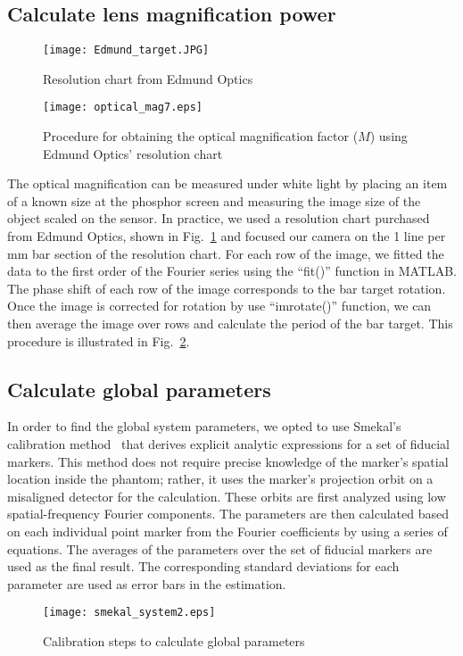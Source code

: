 \subsection{Calculate lens magnification power}
\begin{figure}[ht]
\centering
\texttt{[image: Edmund\_target.JPG]}
\caption{Resolution chart from Edmund Optics}
\label{fig:edmund_target}
\end{figure}

\begin{figure}[ht]
\centering
\texttt{[image: optical\_mag7.eps]}
\caption{Procedure for obtaining the optical magnification factor ($M$) using Edmund Optics' resolution chart}
\label{fig:optical_mag}
\end{figure}
The optical magnification can be measured under white light by placing an item of a known size at the phosphor screen and measuring the image size of the object scaled on the sensor.  In practice, we used a resolution chart purchased from Edmund Optics, shown in Fig.~\ref{fig:edmund_target} and focused our camera on the 1 line per mm bar section of the resolution chart.  For each row of the image, we fitted the data to the first order of the Fourier series using the ``fit()'' function in MATLAB.  The phase shift of each row of the image corresponds to the bar target rotation.  Once the image is corrected for rotation by use ``imrotate()'' function, we can then average the image over rows and calculate the period of the bar target.  This procedure is illustrated in Fig.~\ref{fig:optical_mag}.

\subsection{Calculate global parameters}

In order to find the global system parameters, we opted to use Smekal's calibration method~\citep{Smekal2004} that derives explicit analytic expressions for a set of fiducial markers.  This method does not require precise knowledge of the marker's spatial location inside the phantom; rather, it uses the marker's projection orbit on a misaligned detector for the calculation.  These orbits are first analyzed using low spatial-frequency Fourier components.  The parameters are then calculated based on each individual point marker from the Fourier coefficients by using a series of equations.  The averages of the parameters over the set of fiducial markers are used as the final result.  The corresponding standard deviations for each parameter are used as error bars in the estimation.
%
\begin{figure}[ht]
\texttt{[image: smekal\_system2.eps]}
\caption{Calibration steps to calculate global parameters}
\label{fig:smekal_method}
\end{figure}

